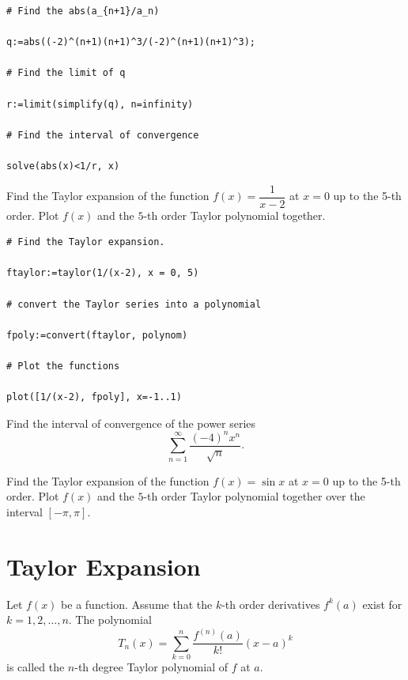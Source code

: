 \documentclass[]{book}
\theoremstyle{definition}
\theoremstyle{definition}
\theoremstyle{definition}
\theoremstyle{remark}
\let\BeginKnitrBlock\begin \let\EndKnitrBlock\end
\begin{document}
\BeginKnitrBlock{solution}
{}

\begin{verbatim}
# Find the abs(a_{n+1}/a_n)

q:=abs((-2)^(n+1)(n+1)^3/(-2)^(n+1)(n+1)^3);

# Find the limit of q

r:=limit(simplify(q), n=infinity)

# Find the interval of convergence

solve(abs(x)<1/r, x)
\end{verbatim}
\EndKnitrBlock{solution}

\BeginKnitrBlock{example}
\protect\hypertarget{exm:unnamed-chunk-3}{}{\label{exm:unnamed-chunk-3} }
Find the Taylor expansion of the function \(f(x)=\dfrac{1}{x-2}\) at \(x=0\) up to the 5-th order. Plot \(f(x)\) and the \(5\)-th order Taylor polynomial together.
\EndKnitrBlock{example}

\BeginKnitrBlock{solution}
{}

\begin{verbatim}
# Find the Taylor expansion.

ftaylor:=taylor(1/(x-2), x = 0, 5)

# convert the Taylor series into a polynomial

fpoly:=convert(ftaylor, polynom)

# Plot the functions

plot([1/(x-2), fpoly], x=-1..1)
\end{verbatim}
\EndKnitrBlock{solution}

\BeginKnitrBlock{exercise}
\protect\hypertarget{exr:unnamed-chunk-5}{}{\label{exr:unnamed-chunk-5} }
Find the interval of convergence of the power series
\[
\sum\limits_{n=1}^{\infty}\dfrac{(-4)^nx^n}{\sqrt{n}}.
\]
\EndKnitrBlock{exercise}

\BeginKnitrBlock{exercise}
\protect\hypertarget{exr:unnamed-chunk-6}{}{\label{exr:unnamed-chunk-6} }
Find the Taylor expansion of the function \(f(x)=\sin x\) at \(x=0\) up to the 5-th order. Plot \(f(x)\) and the \(5\)-th order Taylor polynomial together over the interval \([-\pi,\pi]\).
\EndKnitrBlock{exercise}

\hypertarget{taylor-expansion}{%
\chapter{Taylor Expansion}\label{taylor-expansion}}

Let \(f(x)\) be a function. Assume that the \(k\)-th order derivatives \(f^k(a)\) exist for \(k=1, 2, \dots, n\). The polynomial
\[
T_n(x)=\sum_{k=0}^n\dfrac{f^{(n)}(a)}{k!}(x-a)^k
\]
is called the \(n\)-th degree Taylor polynomial of \(f\) at \(a\).
\end{document}
